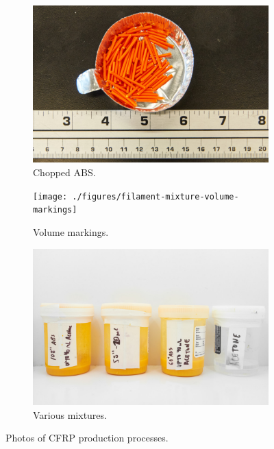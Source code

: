 \begin{figure}[h!]
        \centering
        \begin{subfigure}[b]{0.3\textwidth}
                \includegraphics[width=\textwidth]{./figures/filament-abs-chopped}
                \caption{Chopped ABS.}
                \label{fig:filament-abs-chopped}
        \end{subfigure}%
        \begin{subfigure}[b]{0.3\textwidth}
                \texttt{[image: ./figures/filament-mixture-volume-markings]}
                \caption{Volume markings.}
                \label{fig:filament-mixture-volume-markings}
        \end{subfigure}
        \begin{subfigure}[b]{0.3\textwidth}
                \includegraphics[width=\textwidth]{./figures/filament-mixtures}
                \caption{Various mixtures.}
                \label{fig:filament-mixtures}
        \end{subfigure}
        \caption{Photos of CFRP production processes.}\label{fig:cfrp-methods}
\end{figure}

